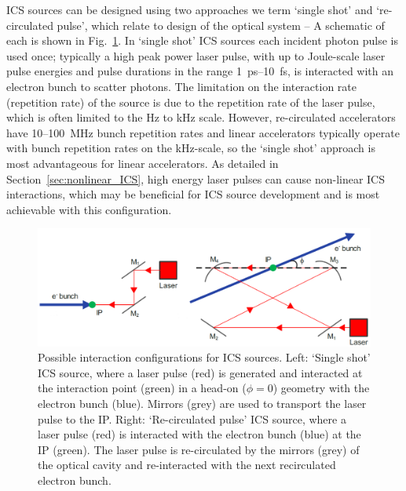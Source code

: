 \documentclass[../main.tex]{subfiles}
\begin{document}
ICS sources can be designed using two approaches we term `single shot' and `re-circulated pulse', which relate to design of the optical system -- A schematic of each is shown in Fig.~\ref{fig:single_shot_4mirror}. In `single shot' ICS sources each incident photon pulse is used once; typically a high peak power laser pulse, with up to Joule-scale laser pulse energies and pulse durations in the range 1~\si{\pico\second}--10~\si{\femto\second}, is interacted with an electron bunch to scatter photons. The limitation on the interaction rate (repetition rate) of the source is due to the repetition rate of the laser pulse, which is often limited to the \si{\hertz} to \si{\kilo\hertz} scale. However, re-circulated accelerators have 10--100~\si{\mega\hertz} bunch repetition rates and linear accelerators typically operate with bunch repetition rates on the \si{\kilo\hertz}-scale, so the `single shot' approach is most advantageous for linear accelerators. As detailed in Section~\ref{sec:nonlinear_ICS}, high energy laser pulses can cause non-linear ICS interactions, which may be beneficial for ICS source development and is most achievable with this configuration. 
\begin{figure}[!h]
\centering
\includegraphics[width=\textwidth]{Figures/Photon_Production_by_Inverse_Compton_Scattering/single_shot_4_mirror.pdf}
\caption{Possible interaction configurations for ICS sources. Left: `Single shot' ICS source, where a laser pulse (red) is generated and interacted at the interaction point (green) in a head-on ($\phi=0$) geometry with the electron bunch (blue). Mirrors (grey) are used to transport the laser pulse to the IP. Right: `Re-circulated pulse' ICS source, where a laser pulse (red) is interacted with the electron bunch (blue) at the IP (green). The laser pulse is re-circulated by the mirrors (grey) of the optical cavity and re-interacted with the next recirculated electron bunch.}
\label{fig:single_shot_4mirror}
\end{figure}
\end{document}
